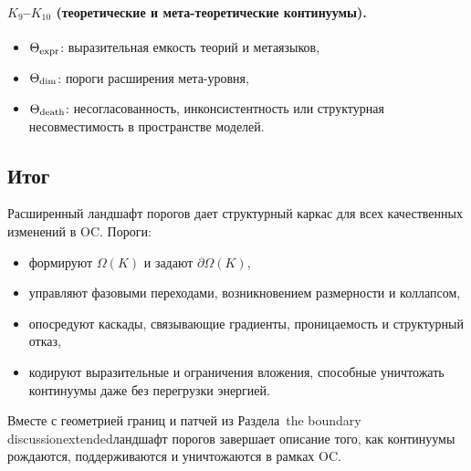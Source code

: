 \paragraph{\texorpdfstring{\(K_9\)}{K_9}–\(K_{10}\) (теоретические и мета-теоретические континуумы).}
\begin{itemize}
    \item \(\Theta_{\rm expr}\): выразительная емкость теорий и
          метаязыков,
    \item \(\Theta_{\rm dim}\): пороги расширения мета-уровня,
    \item \(\Theta_{\rm death}\): несогласованность, инконсистентность или структурная
          несовместимость в пространстве моделей.
\end{itemize}

\subsection{Итог}

Расширенный ландшафт порогов дает структурный каркас для всех
качественных изменений в OC. Пороги:
\begin{itemize}
    \item формируют \(\Omega(K)\) и задают \(\partial\Omega(K)\),
    \item управляют фазовыми переходами, возникновением размерности и коллапсом,
    \item опосредуют каскады, связывающие градиенты, проницаемость и структурный
          отказ,
    \item кодируют выразительные и ограничения вложения, способные уничтожать
          континуумы даже без перегрузки энергией.
\end{itemize}

Вместе с геометрией границ и патчей из
Раздела~the boundary discussionextendedландшафт порогов завершает
описание того, как континуумы рождаются, поддерживаются и уничтожаются в рамках
OC.
